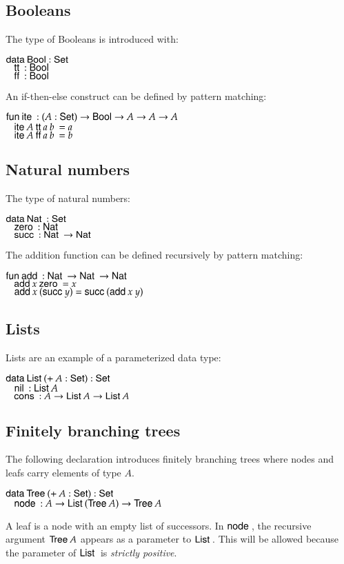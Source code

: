 \subsection{Booleans}

The type of Booleans is introduced with:
\begin{bsp}
$\mathsf{data}\: \mathsf{Bool} : \mathsf{Set}$  \\
$\hspace*{3mm} \mathsf{tt}\: : \mathsf{Bool} $\\
$\hspace*{3mm} \mathsf{ff}\: : \mathsf{Bool} $
\end{bsp}
\noindent An if-then-else construct can be defined by pattern matching:
\begin{bsp}
$\mathsf{fun}\: \mathsf{ite}\: : (A : \mathsf{Set} ) \rightarrow \mathsf{Bool} \rightarrow A \rightarrow A \rightarrow A$\\
$\hspace*{3mm} \mathsf{ite}\: A\: \mathsf{tt}\: a\: b\: = a$\\
$\hspace*{3mm} \mathsf{ite}\: A\: \mathsf{ff}\: a\: b\: = b$
\end{bsp}
\subsection{Natural numbers}
The type of natural numbers:
\begin{bsp}
$\mathsf{data}\: \mathsf{Nat}\: : \mathsf{Set}$ \\
$\hspace*{3mm} \mathsf{zero}\: : \mathsf{Nat}\: $\\
$\hspace*{3mm} \mathsf{succ}\: : \mathsf{Nat}\: \rightarrow \mathsf{Nat}\:$
\end{bsp}

\noindent The addition function can be defined recursively by pattern matching:
\begin{bsp}
$\mathsf{fun}\: \mathsf{add}\: : \mathsf{Nat}\: \rightarrow \mathsf{Nat}\: \rightarrow \mathsf{Nat}\:$\\
$\hspace*{3mm} \mathsf{add}\: x \: \mathsf{zero}\: = x $\\
$\hspace*{3mm} \mathsf{add}\: x \: (\mathsf{succ}\: y) = \mathsf{succ}\: (\mathsf{add}\: x \: y)  $
\end{bsp}
\subsection{Lists}
Lists are an example of a parameterized data type:
\begin{bsp}
$\mathsf{data}\: \mathsf{List}\: ( + \: A : \mathsf{Set} ) : \mathsf{Set} $ \\
$ \hspace*{3mm} \mathsf{nil}\: : \mathsf{List}\: A  $\\
$ \hspace*{3mm} \mathsf{cons}\: : A \rightarrow \mathsf{List}\: A \rightarrow \mathsf{List}\: A $
\end{bsp}
\subsection{Finitely branching trees}
\label{tre}
The following declaration introduces finitely branching trees where nodes and leafs carry elements of type $A$.
\begin{bsp}
$\mathsf{data}\: \mathsf{Tree}\: ( + \: A : \mathsf{Set} ) : \mathsf{Set} $ \\
$ \hspace*{3mm} \mathsf{node}\: : A \rightarrow \mathsf{List}\: (\mathsf{Tree}\: A ) \rightarrow \mathsf{Tree}\: A  $
\end{bsp}
A leaf is a node with an empty list of successors. 
In $\mathsf{node}\:$, the recursive argument $\mathsf{Tree}\: A$ appears as a parameter to $\mathsf{List}\:$.
This will be allowed because the parameter of $\mathsf{List}\:$ is \emph{strictly positive}.
